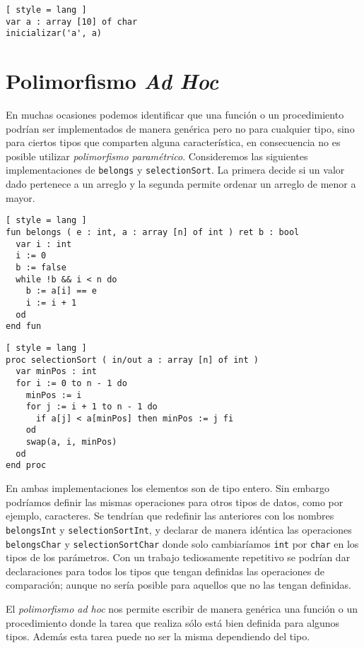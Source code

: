 \begin{lstlisting}[ style = lang ]
var a : array [10] of char
inicializar('a', a)
\end{lstlisting}
\fi

\section{Polimorfismo \textit{Ad Hoc}}

En muchas ocasiones podemos identificar que una función o un procedimiento podrían ser implementados de manera genérica pero no para cualquier tipo, sino para ciertos tipos que comparten alguna característica, en consecuencia no es posible utilizar \textit{polimorfismo paramétrico}.
Consideremos las siguientes implementaciones de \lstinline[style = lang]{belongs} y \lstinline[style = lang]{selectionSort}.
La primera decide si un valor dado pertenece a un arreglo y la segunda permite ordenar un arreglo de menor a mayor.

\begin{lstlisting}[ style = lang ]
fun belongs ( e : int, a : array [n] of int ) ret b : bool
  var i : int
  i := 0
  b := false
  while !b && i < n do
    b := a[i] == e
    i := i + 1
  od
end fun
\end{lstlisting}

\begin{lstlisting}[ style = lang ]
proc selectionSort ( in/out a : array [n] of int )
  var minPos : int
  for i := 0 to n - 1 do
    minPos := i
    for j := i + 1 to n - 1 do
      if a[j] < a[minPos] then minPos := j fi
    od
    swap(a, i, minPos)
  od
end proc
\end{lstlisting}

En ambas implementaciones los elementos son de tipo entero.
Sin embargo podríamos definir las mismas operaciones para otros tipos de datos, como por ejemplo, caracteres.
Se tendrían que redefinir las anteriores con los nombres \lstinline[style = lang]{belongsInt} y \lstinline[style = lang]{selectionSortInt}, y declarar de manera idéntica las operaciones \lstinline[style = lang]{belongsChar} y \lstinline[style = lang]{selectionSortChar} donde solo cambiaríamos \lstinline[style = lang]{int} por \lstinline[style = lang]{char} en los tipos de los parámetros.
Con un trabajo tediosamente repetitivo se podrían dar declaraciones para todos los tipos que tengan definidas las operaciones de comparación; aunque no sería posible para aquellos que no las tengan definidas.

El \textit{polimorfismo ad hoc} nos permite escribir de manera genérica una función o un procedimiento donde la tarea que realiza sólo está bien definida para algunos tipos.
Además esta tarea puede no ser la misma dependiendo del tipo.

